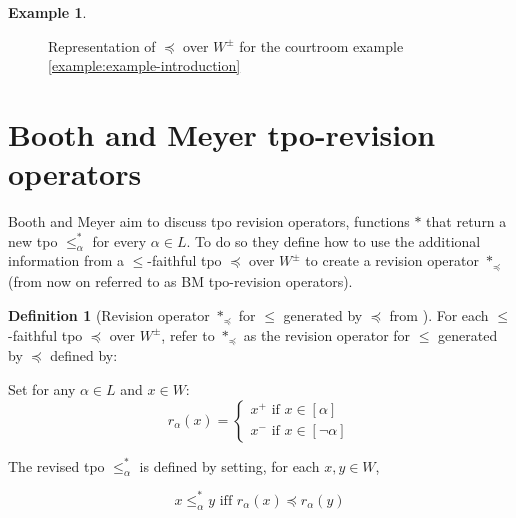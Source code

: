 \documentclass[english, 12pt]{scrartcl}
\theoremstyle{definition}
\newtheorem{example}{Example}[section]
\theoremstyle{definition}
\newtheorem{definition}{Definition}
\theoremstyle{definition}
\begin{document}
\begin{example}
\begin{figure}[h]
            \caption{Representation of $\preceq$ over $W^{\pm}$ for the courtroom example \ref{example:example-introduction}}
            \label{fig:example-tpo-initial}
    \end{figure}
\end{example}

\section{Booth and Meyer tpo-revision operators}
Booth and Meyer \cite{Booth2011} aim to discuss tpo revision operators, functions $\ast$ that return a new tpo $\leq_{\alpha}^{\ast}$ for every $\alpha \in L$. To do so they define how to use the additional information from a $\leq$-faithful tpo $\preceq$ over $W^{\pm}$ to create a revision operator $\ast_{\preceq}$ (from now on referred to as BM tpo-revision operators).

\begin{definition}[Revision operator $\ast_{\preceq}$ for $\leq$ generated by $\preceq$ from \cite{Booth2011}]
    \label{definition:revision-operator}
    For each $\leq$-faithful tpo $\preceq$ over $W^{\pm}$, refer to $\ast_{\preceq}$ as the revision operator for $\leq$ generated by $\preceq$ defined by:
    
    Set for any $\alpha \in L$ and $x \in W$:
    \begin{equation*}
        r_{\alpha}(x) = \left\{
                    \begin{array}{ll}
                      x^{+} \textrm{ if } x \in [\alpha]\\
                      x^{-} \textrm{ if } x \in [\neg\alpha]
                    \end{array}
                  \right.
    \end{equation*}
    
    The revised tpo $\leq_{\alpha}^{\ast}$ is defined by setting, for each $x, y \in W$,

    \begin{equation*}
        x \leq_{\alpha}^{\ast} y \textrm{ iff } r_{\alpha}(x) \preceq r_{\alpha}(y)
    \end{equation*}
\end{definition}
\end{document}
